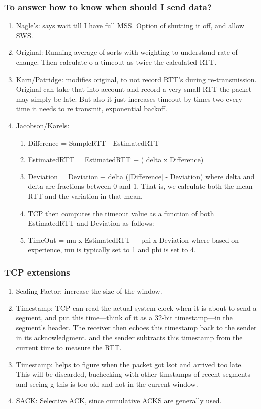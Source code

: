 \documentclass[11pt, a4paper]{article}
\begin{document}
\subsubsection{To answer how to know when should I send data?}
\begin{enumerate}
    \item Nagle's: says wait till I have full MSS. Option of shutting it off, and allow SWS.
    \item Original: Running average of sorts with weighting to understand rate of change. Then calculate o a timeout as twice the calculated RTT.
    \item Karn/Patridge: modifies original, to not record RTT's during re-transmission. Original can take that into account and record a very small RTT the packet may simply be late. But also it just increases timeout by times two every time it needs to re transmit, exponential backoff.
    \item Jacobson/Karels:
    \begin{enumerate}
        \item Difference = SampleRTT - EstimatedRTT
        \item EstimatedRTT = EstimatedRTT + ( delta x Difference)
        \item Deviation = Deviation + delta (|Difference| - Deviation) where delta and delta are fractions between 0 and 1. That is, we calculate both the mean RTT and the variation in that mean.
        \item TCP then computes the timeout value as a function of both EstimatedRTT and Deviation as follows:
        \item TimeOut = mu x EstimatedRTT + phi x Deviation where based on experience, mu is typically set to 1 and phi is set to 4.
    \end{enumerate}
\end{enumerate}
\subsubsection{TCP extensions}
\begin{enumerate}
    \item Scaling Factor: increase the size of the window.
    \item Timestamp: TCP can read the actual system clock when it is about to send a segment, and put this time—think of it as a 32-bit timestamp—in the segment’s header. The receiver then echoes this timestamp back to the sender in its acknowledgment, and the sender subtracts this timestamp from the current time to measure the RTT.
    \item Timestamp: helps to figure when the packet got lsot and arrived too late. This will be discarded, buchecking with other timstamps of recent segments and seeing g this is too old and not in the current window.
    \item SACK: Selective ACK, since cumulative ACKS are generally used.
\end{enumerate}
\end{document}
